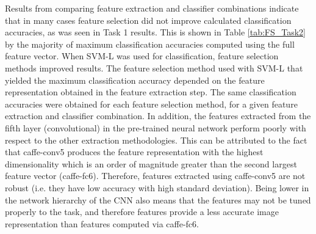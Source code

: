 Results from comparing feature extraction and classifier combinations indicate that in many cases feature selection did not improve calculated classification accuracies, as was seen in Task 1 results.  This is shown in Table \ref{tab:FS_Task2} by the majority of maximum classification accuracies computed using the full feature vector. 
%
When SVM-L was used for classification, feature selection methods improved results.  The feature selection method used with SVM-L that yielded the maximum classification accuracy depended on the feature representation obtained in the feature extraction step. 
%
The same classification accuracies were obtained for each feature selection method, for a given feature extraction and classifier combination. In addition, the features extracted from the fifth layer (convolutional) in the pre-trained neural network perform poorly with respect to the other extraction methodologies. This can be attributed to the fact that caffe-conv5 produces the feature representation with the highest dimensionality which is an order of magnitude greater than the second largest feature vector (caffe-fc6). Therefore, features extracted using caffe-conv5 are not robust (i.e. they have low accuracy with high standard deviation).  Being lower in the network hierarchy of the CNN also means that the features may not be tuned properly to the task, and therefore features provide a less accurate image representation than features computed via caffe-fc6.  
